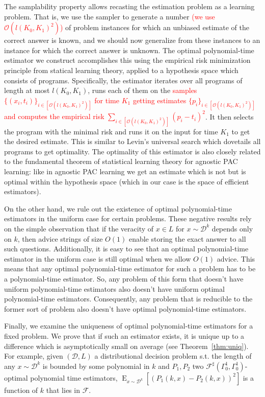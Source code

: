 \documentclass[11pt]{article}
\numberwithin{equation}{section}
\theoremstyle{definition}
\theoremstyle{plain}
\DeclareMathOperator{\E}{E}
\newcommand{\Dist}{\mathcal{D}}
\newcommand{\Fall}{\mathcal{F}}
\begin{document}
The samplability property allows recasting the estimation problem as a learning problem. That is, we use the sampler to generate a number \textcolor{red}{(we use ${\mathcal{O}(l(K_0,K_1)^2)}$)} of problem instances for which an unbiased estimate of the correct answer is known, and we should now generalize from these instances to an instance for which the correct answer is unknown. The optimal polynomial-time estimator we construct accomplishes this using the empirical risk minimization principle from statical learning theory, applied to a hypothesis space which consists of programs. Specifically, the estimator iterates over all programs of length at most ${l(K_0,K_1)}$, runs each of them on the \textcolor{red}{samples ${\{(x_i,t_i)\}_{i \in [\mathcal{O}(l(K_0,K_1)^2)]}}$ for time ${K_1}$ getting estimates ${\{p_i\}_{i \in [\mathcal{O}(l(K_0,K_1)^2)]}}$ and computes the empirical risk ${\sum_{i \in [\mathcal{O}(l(K_0,K_1)^2)]}(p_i-t_i)^2}$}. It then selects the program with the minimal risk and runs it on the input for time ${K_1}$ to get the desired estimate. This is similar to Levin's universal search which dovetails all programs to get optimality. The optimality of this estimator is also closely related to the fundamental theorem of statistical learning theory for agnostic PAC learning\cite{Shalev-Shwartz_2014}: like in agnostic PAC learning we get an estimate which is not  but is optimal within the hypothesis space (which in our case is the space of efficient estimators).

On the other hand, we rule out the existence of optimal polynomial-time estimators in the uniform case for certain problems. These negative results rely on the simple observation that if the veracity of ${x \in L}$ for ${x \sim \Dist^k}$ depends only on ${k}$, then advice strings of size $O(1)$ enable storing the exact answer to all such questions. Additionally, it is easy to see that an optimal polynomial-time estimator in the uniform case is still optimal when we allow ${O(1)}$ advice. This means that any optimal polynomial-time estimator for such a problem has to be a  polynomial-time estimator. So, any problem of this form that doesn't have uniform  polynomial-time estimators also doesn't have uniform optimal polynomial-time estimators. Consequently, any problem that is reducible to the former sort of problem also doesn't have optimal polynomial-time estimators.

Finally, we examine the uniqueness of optimal polynomial-time estimators for a fixed problem. We prove that if such an estimator exists, it is unique up to a difference which is asymptotically small on average (see Theorem~\ref{thm:uniq}). For example, given ${(\Dist,L)}$ a distributional decision problem s.t. the length of any ${x \sim \Dist^k}$ is bounded by some polynomial in ${k}$ and ${P_1,P_2}$ two ${\Fall^\sharp(\Gamma_0^1,\Gamma_0^1)}$-optimal polynomial time estimators, ${\E_{x \sim \Dist^k}[(P_1(k,x)-P_2(k,x))^2]}$ is a function of ${k}$ that lies in ${\Fall}$.
\end{document}
